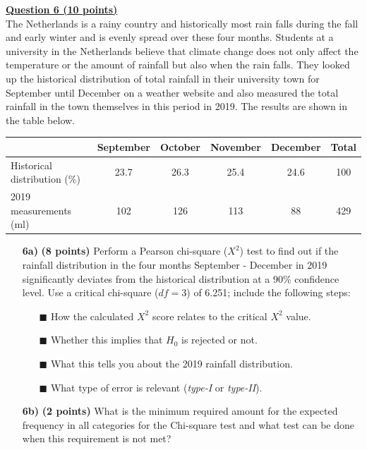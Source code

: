\underline{\textbf{Question 6 (10 points)}} \\

The Netherlands is a rainy country and historically most rain falls during the fall and early winter and is evenly spread over these four months. Students at a university in the Netherlands believe that climate change does not only affect the temperature or the amount of rainfall but also when the rain falls. They looked up the historical distribution of total rainfall in their university town for September until December on a weather website and also measured the total rainfall in the town themselves in this period in 2019. The results are shown in the table below. \\

\begin{center}
\begin{tabular}{l|c|c|c|c|c}
     & September & October & November & December & Total \\
     \hline
     Historical distribution (\%) & 23.7 & 26.3 & 25.4 & 24.6 & 100 \\
     2019 measurements (ml) & 102 & 126 & 113 & 88 & 429
\end{tabular}
\end{center} 

\begin{itemize}

    \item[\textbf{6a)}] \textbf{(8 points)} Perform a Pearson chi-square ($X^2$) test to find out if the rainfall distribution in the four months September - December in 2019 significantly deviates from the historical distribution at a 90\% confidence level. Use a critical chi-square ($df = 3$) of 6.251; include the following steps:
    \begin{enumerate}
        \item[$\blacksquare$] How the calculated $X^2$ score relates to the critical $X^2$ value.
        \item[$\blacksquare$] Whether this implies that $H_0$ is rejected or not.
        \item[$\blacksquare$] What this tells you about the 2019 rainfall distribution.
        \item[$\blacksquare$] What type of error is relevant (\textit{type-I} or \textit{type-II}).
    \end{enumerate}
    
    \item[\textbf{6b)}] \textbf{(2 points)} What is the minimum required amount for the expected frequency in all categories for the Chi-square test and what test can be done when this requirement is not met?

\end{itemize}

